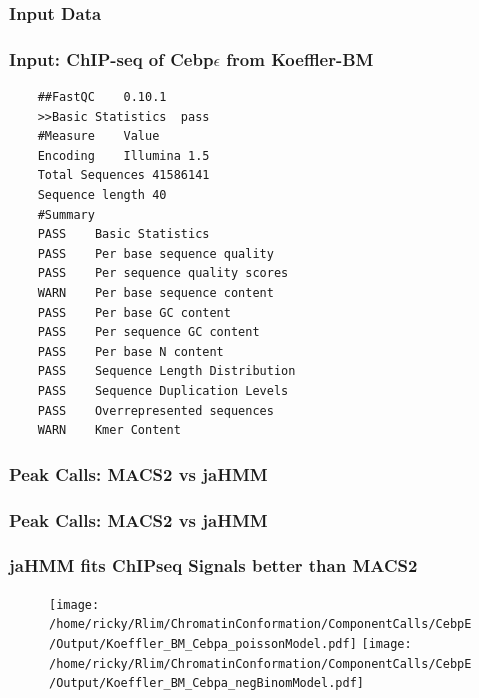 \documentclass[notes]{beamer}
\begin{document}
\subsubsection{Input Data}
\begin{frame}
    \frametitle{Input: ChIP-seq of Cebp$\epsilon$ from Koeffler-BM}
    \begin{lstlisting}
    ##FastQC    0.10.1
    >>Basic Statistics  pass
    #Measure    Value   
    Encoding    Illumina 1.5    
    Total Sequences 41586141    
    Sequence length 40  
    #Summary
    PASS    Basic Statistics    
    PASS    Per base sequence quality   
    PASS    Per sequence quality scores 
    WARN    Per base sequence content   
    PASS    Per base GC content 
    PASS    Per sequence GC content 
    PASS    Per base N content  
    PASS    Sequence Length Distribution    
    PASS    Sequence Duplication Levels 
    PASS    Overrepresented sequences   
    WARN    Kmer Content    
    \end{lstlisting}
\end{frame}
    

\subsubsection{Peak Calls: MACS2 vs jaHMM}
\begin{frame}
    \frametitle{Peak Calls: MACS2 vs jaHMM}
    \begin{itemize}
    \end{itemize}
\end{frame}

\begin{frame}[plain]
    \frametitle{jaHMM fits ChIPseq Signals better than MACS2}
    \begin{figure}
        \texttt{[image: /home/ricky/Rlim/ChromatinConformation/ComponentCalls/CebpE/Output/Koeffler\_BM\_Cebpa\_poissonModel.pdf]}
        \texttt{[image: /home/ricky/Rlim/ChromatinConformation/ComponentCalls/CebpE/Output/Koeffler\_BM\_Cebpa\_negBinomModel.pdf]}
    \end{figure}
\end{frame}
\end{document}

